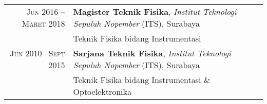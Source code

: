 %
%



\begin{tabular}{rl}
	\textsc{Jun 2016 -- Maret 2018} &  \textbf{Magister Teknik Fisika},  \emph{Institut Teknologi Sepuluh Nopember} (ITS), Surabaya\\
									&  Teknik Fisika bidang Instrumentasi \\
	\textsc{Jun 2010 --Sept 2015} 	&  \textbf{Sarjana Teknik Fisika},  \emph{Institut Teknologi Sepuluh Nopember} (ITS), Surabaya\\
									&  Teknik Fisika bidang Instrumentasi \& Optoelektronika \\
\end{tabular}